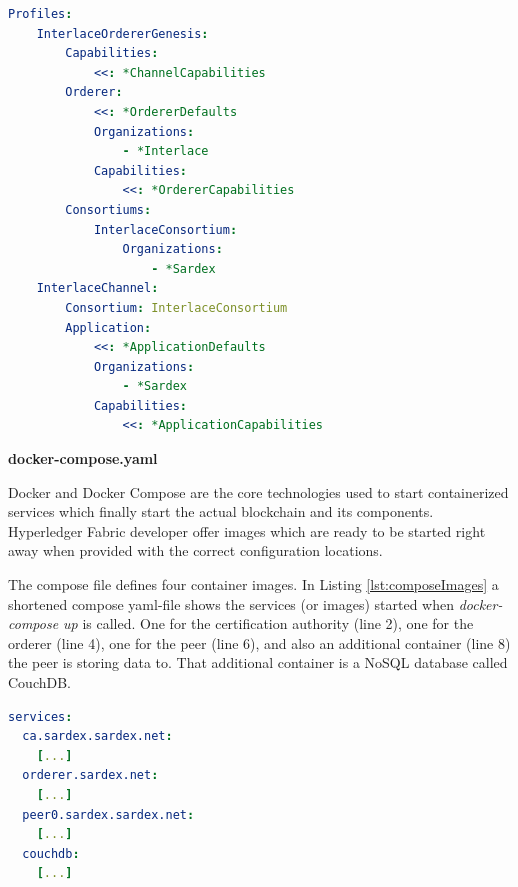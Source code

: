 \begin{center}
\vspace{-.3cm}
\begin{minipage}{0.8\textwidth}
\small
\begin{lstlisting}[language=yaml,firstnumber=1,caption={\bf\small configtx.yaml excerpt -- Profiles definition}, captionpos=b,label=lst:configTxProfiles]
Profiles:
    InterlaceOrdererGenesis:
        Capabilities:
            <<: *ChannelCapabilities
        Orderer:
            <<: *OrdererDefaults
            Organizations:
                - *Interlace
            Capabilities:
                <<: *OrdererCapabilities
        Consortiums:
            InterlaceConsortium:
                Organizations:
                    - *Sardex
    InterlaceChannel:
        Consortium: InterlaceConsortium
        Application:
            <<: *ApplicationDefaults
            Organizations:
                - *Sardex
            Capabilities:
                <<: *ApplicationCapabilities
\end{lstlisting}
\end{minipage}
\vspace{-.3cm}
\end{center}

\textbf{docker-compose.yaml}

Docker and Docker Compose are the core technologies used to start containerized services which finally start the actual blockchain and its components. Hyperledger Fabric developer offer images which are ready to be started right away when provided with the correct configuration locations.

The compose file defines four container images. In Listing \ref{lst:composeImages} a shortened compose yaml-file shows the services (or images) started when \textit{docker-compose up} is called. One for the certification authority (line 2), one for the orderer (line 4), one for the peer (line 6), and also an additional container (line 8) the peer is storing data to. That additional container is a NoSQL database called CouchDB. 

\begin{center}
\begin{minipage}{0.8\textwidth}
\small
\begin{lstlisting}[language=yaml,firstnumber=1,caption={\bf\small docker-compose.yaml excerpt}, captionpos=b,label=lst:composeImages]
services:
  ca.sardex.sardex.net:
    [...]
  orderer.sardex.net:
    [...]
  peer0.sardex.sardex.net:
    [...]
  couchdb:
    [...]
\end{lstlisting}
\end{minipage}
\end{center}

